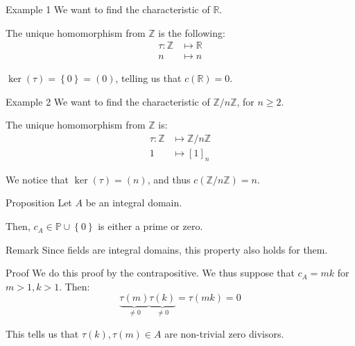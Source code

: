 \documentclass[a4paper]{article}
\begin{document}
\begin{parag}{Example 1}
    We want to find the characteristic of $\mathbb{R}$.

    The unique homomorphism from $\mathbb{Z}$ is the following:
    \[\begin{split}
    \tau: \mathbb{Z} &\longmapsto \mathbb{R} \\
    n &\longmapsto n
    \end{split}\]
    
    $\ker\left(\tau\right) = \left\{0\right\} = \left(0\right)$, telling us that $c\left(\mathbb{R}\right) = 0$. 
\end{parag}

\begin{parag}{Example 2}
    We want to find the characteristic of $\mathbb{Z}/n\mathbb{Z}$, for $n \geq 2$.

    The unique homomorphism from $\mathbb{Z}$ is: 
    \[\begin{split}
    \tau: \mathbb{Z} &\longmapsto \mathbb{Z}/n\mathbb{Z} \\
    1 &\longmapsto \left[1\right]_n
    \end{split}\]
    
    We notice that $\ker\left(\tau\right) = \left(n\right)$, and thus $c\left(\mathbb{Z}/n\mathbb{Z}\right) = n$.
\end{parag}

\begin{parag}{Proposition}
    Let $A$ be an integral domain.

    Then, $c_A \in \mathbb{P} \cup \left\{0\right\}$ is either a prime or zero.

    \begin{subparag}{Remark}
        Since fields are integral domains, this property also holds for them.
    \end{subparag}

    \begin{subparag}{Proof}
        We do this proof by the contrapositive. We thus suppose that $c_A = m k$ for $m> 1, k > 1$. Then: 
        \[\underbrace{\tau\left(m\right)}_{\neq 0} \underbrace{\tau\left(k\right)}_{\neq 0} = \tau\left(m k\right) = 0\]
        
        This tells us that $\tau\left(k\right), \tau\left(m\right) \in A$ are non-trivial zero divisors.
    \end{subparag}
\end{parag}
\end{document}

